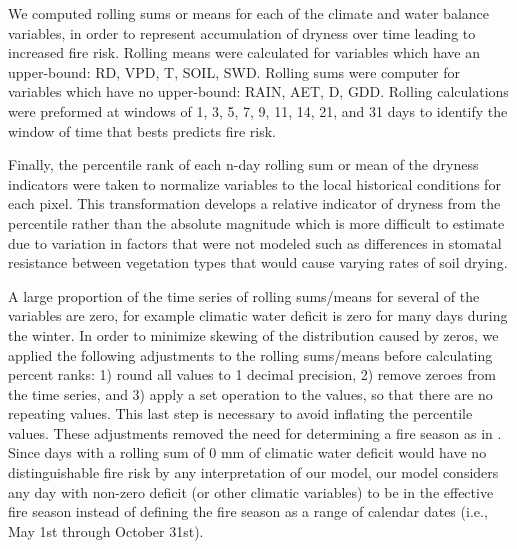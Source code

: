 \documentclass[11pt]{article}
\begin{document}
We computed rolling sums or means for each of the climate and water balance variables, in order to represent accumulation of dryness over time leading to increased fire risk.  Rolling means were calculated for variables which have an upper-bound: RD, VPD, T, SOIL, SWD. Rolling sums were computer for variables which have no upper-bound: RAIN, AET, D, GDD.  Rolling calculations were preformed at windows of 1, 3, 5, 7, 9, 11, 14, 21, and 31 days to identify the window of time that bests predicts fire risk.

Finally, the percentile rank of each n-day rolling sum or mean of the dryness indicators were taken to normalize variables to the local historical conditions for each pixel.  This transformation develops a relative indicator of dryness from the percentile rather than the absolute magnitude which is more difficult to estimate due to variation in factors that were not modeled such as differences in stomatal resistance between vegetation types that would cause varying rates of soil drying. 

A large proportion of the time series of rolling sums/means for several of the variables are zero, for example climatic water deficit is zero for many days during the winter.  %
In order to minimize skewing of the distribution caused by zeros, we applied the following adjustments to the rolling sums/means before calculating percent ranks: 1) round all values to 1 decimal precision, 2) remove zeroes from the time series, and 3) apply a set operation to the values, so that there are no repeating values.  This last step is necessary to avoid inflating the percentile values. These adjustments %
removed the need for determining a fire season as in \citet{thomaWaterBalanceIndicator2020}.  Since days with a rolling sum of 0 mm of climatic water deficit would have no distinguishable fire risk by any interpretation of our model, our model considers any day with non-zero deficit (or other climatic variables) to be in the effective fire season instead of defining the fire season as a range of calendar dates (i.e., May 1st through October 31st).
\end{document}

